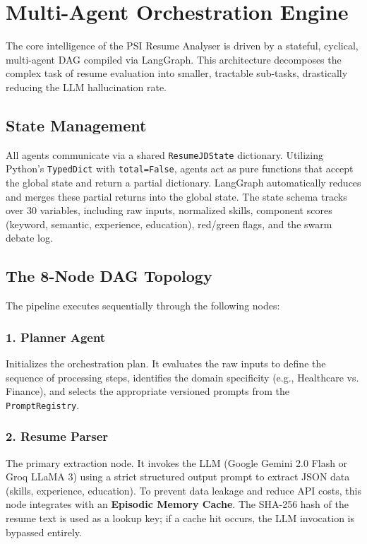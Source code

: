 \section{Multi-Agent Orchestration Engine}\label{sec:multi_agent}

The core intelligence of the PSI Resume Analyser is driven by a stateful, cyclical, multi-agent DAG compiled via LangGraph. This architecture decomposes the complex task of resume evaluation into smaller, tractable sub-tasks, drastically reducing the LLM hallucination rate.

\subsection{State Management}
All agents communicate via a shared \texttt{ResumeJDState} dictionary. Utilizing Python's \texttt{TypedDict} with \texttt{total=False}, agents act as pure functions that accept the global state and return a partial dictionary. LangGraph automatically reduces and merges these partial returns into the global state. The state schema tracks over 30 variables, including raw inputs, normalized skills, component scores (keyword, semantic, experience, education), red/green flags, and the swarm debate log.

\subsection{The 8-Node DAG Topology}
The pipeline executes sequentially through the following nodes:

\subsubsection{1. Planner Agent}
Initializes the orchestration plan. It evaluates the raw inputs to define the sequence of processing steps, identifies the domain specificity (e.g., Healthcare vs. Finance), and selects the appropriate versioned prompts from the \texttt{PromptRegistry}.

\subsubsection{2. Resume Parser}
The primary extraction node. It invokes the LLM (Google Gemini 2.0 Flash or Groq LLaMA 3) using a strict structured output prompt to extract JSON data (skills, experience, education). To prevent data leakage and reduce API costs, this node integrates with an \textbf{Episodic Memory Cache}. The SHA-256 hash of the resume text is used as a lookup key; if a cache hit occurs, the LLM invocation is bypassed entirely.

